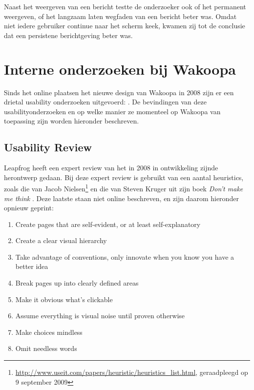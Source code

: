 \documentclass[a4paper, 10pt, pdftex]{report}
\begin{document}
    Naast het weergeven van een bericht testte de onderzoeker ook of het permanent weergeven, of het langzaam laten wegfaden van een bericht beter was. Omdat niet iedere gebruiker continue naar het scherm keek, kwamen zij tot de conclusie dat een persistene berichtgeving beter was.

  \section{Interne onderzoeken bij Wakoopa}
    Sinds het online plaatsen het nieuwe design van Wakoopa in 2008 zijn er een drietal usability onderzoeken uitgevoerd: \citet{Timmerman2008, Hoekman2008, Alfrink2008}. De bevindingen van deze usabilityonderzoeken en op welke manier ze momenteel op Wakoopa van toepassing zijn worden hieronder beschreven.

    \subsection{Usability Review \citet{Alfrink2008}}
    Leapfrog heeft een expert review van het in 2008 in ontwikkeling zijnde herontwerp gedaan. Bij deze expert review is gebruikt van een aantal heuristics, zoals die van Jacob Nielsen\footnote{\url{http://www.useit.com/papers/heuristic/heuristics\_list.html}, geraadpleegd op 9 september 2009} en die van Steven Kruger uit zijn boek \emph{Don't make me think} \citep{Krug2000}. Deze laatste staan niet online beschreven, en zijn daarom hieronder opnieuw geprint:

      \begin{enumerate}
        \item Create pages that are self-evident, or at least self-explanatory
        \item Create a clear visual hierarchy
        \item Take advantage of conventions, only innovate when you know you have a better idea
        \item Break pages up into clearly defined areas
        \item Make it obvious what's clickable
        \item Assume everything is visual noise until proven otherwise
        \item Make choices mindless
        \item Omit needless words
      \end{enumerate}
\end{document}
